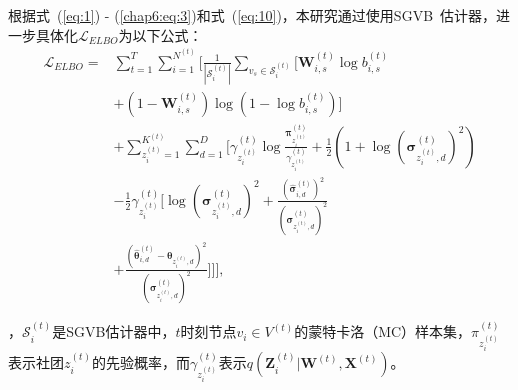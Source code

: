 根据式~(\ref{eq:1}) - (\ref{chap6:eq:3})和式~(\ref{eq:10})，本研究通过使用SGVB~\cite{kingma2013auto}估计器，进一步具体化$\mathcal{L}_{ELBO}$为以下公式：
\begin{align} 
{\mathcal{L}_{ELBO}}  = &\sum_{t=1}^T \sum_{i=1}^{N^{(t)}}\Bigg[ \frac{1}{|\mathcal{S}_i^{(t)}|} \sum_{v_s\in \mathcal{S}_i^{(t)}} \Big[ \mathbf{W}_{i,s}^{(t)}\log{b_{i,s}^{(t)}} \nonumber\\
& + (1-\mathbf{W}_{i,s}^{(t)}) \log(1-\log{b_{i,s}^{(t)}}) \Big]\nonumber \\
&  + \sum_{z_i^{(t)}=1}^{K^{(t)}} \sum_{d=1}^{D}\Big[ \gamma_{z_i^{(t)}}^{(t)} \log\frac{\bm{\pi}_{z_i^{(t)}}^{(t)}}{\gamma_{z_i^{(t)}}^{(t)}} + \frac{1}{2} (1 + \log(\bm{\sigma}_{z_i^{(t)},d}^{(t)})^2) \nonumber\\
& - \frac{1}{2} \gamma_{z_i^{(t)}}^{(t)} \big[\log{(\bm{\sigma}_{z_i^{(t)},d}^{(t)})^2} + \frac{(\hat{\bm{\sigma}}_{i,d}^{(t)})^2}{(\bm{\sigma}_{z_i^{(t)},d}^{(t)})^2} \nonumber\\
& + \frac{({\hat{\bm{\theta}}}_{i,d}^{(t)} - \bm{\theta}_{z_i^{(t)},d})^{2}}{(\bm{\sigma}_{z_i^{(t)},d}^{(t)})^2}\big]\Big] \Bigg], 
\label{eq:16}
\end{align}

，$\mathcal{S}_i^{(t)}$是SGVB估计器中，$t$时刻节点$v_i \in V^{(t)}$的蒙特卡洛（MC）样本集，$\pi_{z_i^{(t)}}^{(t)}$表示社团$z_i^{(t)}$的先验概率，而$\gamma_{z_i^{(t)}}^{(t)}$表示$q(\mathbf{Z}_i^{(t)}|\mathbf{W}^{(t)},\mathbf{X}^{(t)})$。



